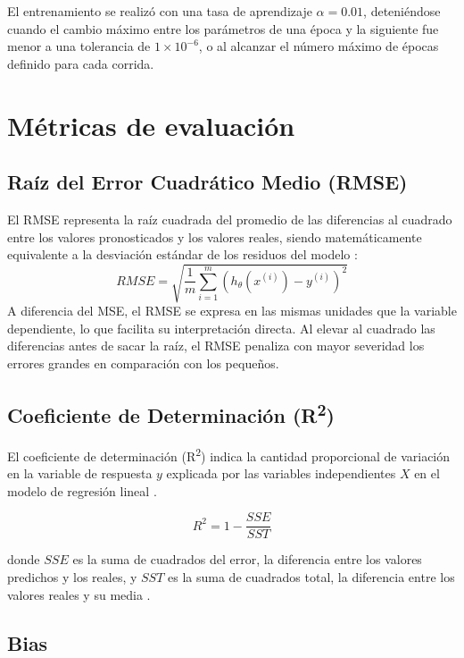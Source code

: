 \documentclass[10pt,journal,compsoc]{IEEEtran}
\begin{document}
El entrenamiento se realizó con una tasa de aprendizaje $\alpha = 0.01$, deteniéndose cuando el cambio máximo entre los parámetros de una época y la siguiente fue menor a una tolerancia de $1\times10^{-6}$, o al alcanzar el número máximo de épocas 
definido para cada corrida.


\section{Métricas de evaluación}

\subsection{Raíz del Error Cuadrático Medio (RMSE)}
El RMSE representa la raíz cuadrada del promedio de las diferencias al cuadrado entre los valores pronosticados y los valores reales, siendo matemáticamente equivalente a la desviación estándar de los residuos del modelo \cite{funcion_costo}:
\begin{equation}
RMSE = \sqrt{\frac{1}{m}\sum_{i=1}^{m} \left( h_\theta(x^{(i)}) - y^{(i)} \right)^2}
\label{eq:rmse}
\end{equation}
A diferencia del MSE, el RMSE se expresa en las mismas unidades que la variable dependiente, lo que facilita su interpretación directa. Al elevar al cuadrado las diferencias antes de sacar la raíz, el RMSE penaliza con mayor severidad los errores grandes en comparación con los pequeños.

\subsection{Coeficiente de Determinación (R\textsuperscript{2})}
El coeficiente de determinación (R\textsuperscript{2}) indica la cantidad proporcional de variación en la variable de respuesta $y$ explicada por las variables independientes $X$ en el modelo de regresión lineal \cite{r2}.

\begin{equation}
R^2 = 1 - \frac{SSE}{SST}
\label{eq:r2}
\end{equation}

donde $SSE$ es la suma de cuadrados del error, la diferencia entre los valores predichos y los reales, y $SST$ es la suma de cuadrados total, la diferencia entre los valores reales y su media \cite{sss}. 

\subsection{Bias}
\end{document}
